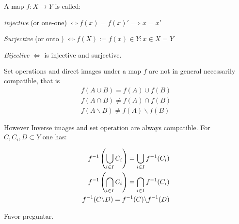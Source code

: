 A map $ f: X \rightarrow Y $ is called:
\begin{center}
	\textit{injective} (or one-one) $ \iff f(x) = f(x)' \implies x = x'$ 
	
	\textit{Surjective} (or onto ) $ \iff f(X) := {f(x) \in Y : x \in X} = Y $
	
	\textit{Bijective} $ \iff $ is injective and surjective.
\end{center}

Set operations and direct images under a map $f$ are not in general necessarily compatible, that is
\begin{align*}
f(A \cup B) = f(A) \cup f(B) \\
f(A \cap B) \neq f(A) \cap f(B) \\
f( A \backslash B ) \neq f(A) \backslash f(B)
\end{align*}

However Inverse images and set operation are always compatible. For $C, C_i, D \subset Y$ one has:

\begin{align*}
f^{-1}\left(  \bigcup_{i \in I} C_i \right) = \bigcup_{i \in I} f^{-1}(C_i) \\ 
f^{-1}\left(  \bigcap_{i \in I} C_i \right) = \bigcap_{i \in I} f^{-1} (C_i) \\ 
f^{-1}( C \backslash D) = f^{-1}(C) \backslash f^{-1}(D)
\end{align*}

Favor preguntar.
